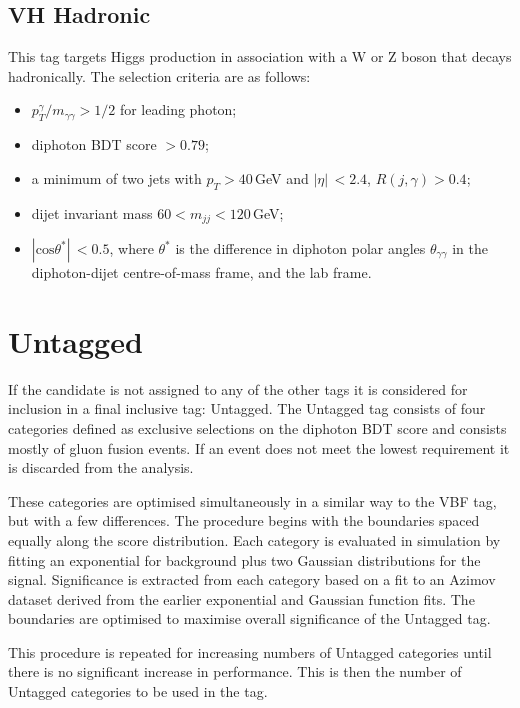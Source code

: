 \subsection{VH Hadronic}
This tag targets Higgs production in association with a W or Z boson that decays hadronically. The selection criteria are as follows:
\begin{itemize}[noitemsep]
    \item $p^{\gamma}_{T}/m_{\gamma\gamma} > 1/2$ for leading photon;
    \item diphoton BDT score $> 0.79$;
    \item a minimum of two jets with $p_T > 40$\,GeV and $|\eta|\, < 2.4$, $R(j,\gamma) > 0.4$;
    \item dijet invariant mass $60 < m_{jj} < 120$\,GeV;
    \item $|\mathrm{cos}{\theta^{*}}| \,< 0.5$, where $\theta^{*}$ is the difference in diphoton polar angles $\theta_{\gamma\gamma}$ in the diphoton-dijet centre-of-mass frame, and the lab frame.  
\end{itemize}




\section{Untagged}
If the candidate is not assigned to any of the other tags it is considered for inclusion in a final inclusive tag: Untagged. 
The Untagged tag consists of four categories defined as exclusive selections on the diphoton BDT score and consists mostly of gluon fusion events. 
If an event does not meet the lowest requirement it is discarded from the analysis.

These categories are optimised simultaneously in a similar way to the VBF tag, but with a few differences. 
The procedure begins with the boundaries spaced equally along the score distribution. Each category is evaluated in simulation by fitting an exponential for background plus two Gaussian distributions for the signal. 
Significance is extracted from each category based on a fit to an Azimov dataset derived from the earlier exponential and Gaussian function fits. 
The boundaries are optimised to maximise overall significance of the Untagged tag.

This procedure is repeated for increasing numbers of Untagged categories until there is no significant increase in performance. This is then the number of Untagged categories to be used in the tag.












